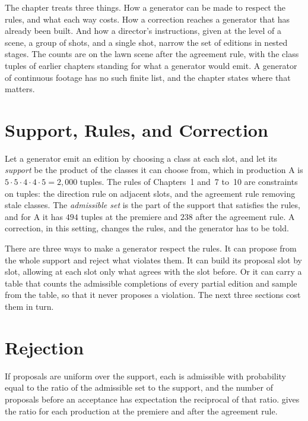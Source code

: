 \documentclass[11pt,twoside,openright]{book}
\theoremstyle{plain}
\theoremstyle{definition}
\theoremstyle{remark}
\begin{document}
The chapter treats three things. How a generator can be made to respect the rules, and what each way costs. How a correction reaches a generator that has already been built. And how a director's instructions, given at the level of a scene, a group of shots, and a single shot, narrow the set of editions in nested stages. The counts are on the lawn scene after the agreement rule, with the class tuples of earlier chapters standing for what a generator would emit. A generator of continuous footage has no such finite list, and the chapter states where that matters.

\section{Support, Rules, and Correction}\label{sec:support16}

Let a generator emit an edition by choosing a class at each slot, and let its \emph{support} be the product of the classes it can choose from, which in production A is $5\cdot5\cdot4\cdot4\cdot5=2{,}000$ tuples. The rules of Chapters~1 and~7 to~10 are constraints on tuples: the direction rule on adjacent slots, and the agreement rule removing stale classes. The \emph{admissible set} is the part of the support that satisfies the rules, and for A it has $494$ tuples at the premiere and $238$ after the agreement rule. A correction, in this setting, changes the rules, and the generator has to be told.

There are three ways to make a generator respect the rules. It can propose from the whole support and reject what violates them. It can build its proposal slot by slot, allowing at each slot only what agrees with the slot before. Or it can carry a table that counts the admissible completions of every partial edition and sample from the table, so that it never proposes a violation. The next three sections cost them in turn.

\section{Rejection}\label{sec:reject16}

If proposals are uniform over the support, each is admissible with probability equal to the ratio of the admissible set to the support, and the number of proposals before an acceptance has expectation the reciprocal of that ratio.  gives the ratio for each production at the premiere and after the agreement rule.
\end{document}
